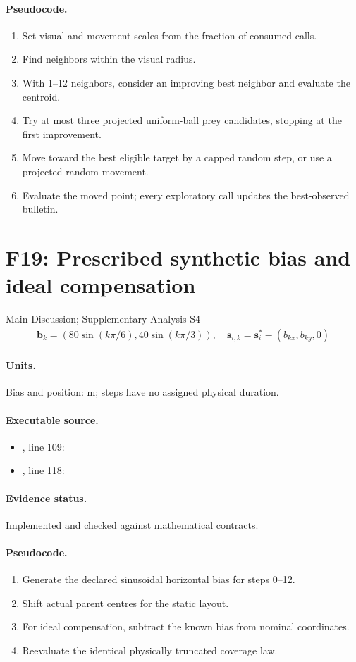 \documentclass[10pt]{article}
\begin{document}
\paragraph{Pseudocode.}
\begin{enumerate}[leftmargin=*]
\item Set visual and movement scales from the fraction of consumed calls.
\item Find neighbors within the visual radius.
\item With 1--12 neighbors, consider an improving best neighbor and evaluate the centroid.
\item Try at most three projected uniform-ball prey candidates, stopping at the first improvement.
\item Move toward the best eligible target by a capped random step, or use a projected random movement.
\item Evaluate the moved point; every exploratory call updates the best-observed bulletin.
\end{enumerate}
\newpage
\section*{F19: Prescribed synthetic bias and ideal compensation}
Main Discussion; Supplementary Analysis S4
\begin{gather*}\mathbf b_k=(80\sin(k\pi/6),40\sin(k\pi/3)),\quad\mathbf s_{i,k}=\mathbf s_i^*-(b_{kx},b_{ky},0)\end{gather*}
\paragraph{Units.} Bias and position: m; steps have no assigned physical duration.
\paragraph{Executable source.}
\begin{itemize}[leftmargin=*]
\item {}, line 109: 
\item {}, line 118: 
\end{itemize}
\paragraph{Evidence status.} Implemented and checked against mathematical contracts.
\paragraph{Pseudocode.}
\begin{enumerate}[leftmargin=*]
\item Generate the declared sinusoidal horizontal bias for steps 0--12.
\item Shift actual parent centres for the static layout.
\item For ideal compensation, subtract the known bias from nominal coordinates.
\item Reevaluate the identical physically truncated coverage law.
\end{enumerate}
\newpage
\end{document}
